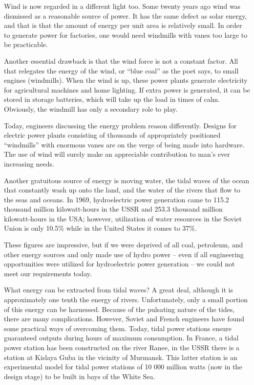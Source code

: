 Wind is now regarded in a different light too. Some twenty years ago wind was dismissed as a reasonable source of power. It has the same defect as solar energy, and that is that the amount of energy per unit area is relatively small. In order to generate power for factories, one would need windmills with vanes too large to be prac­ticable.

Another essential drawback is that the wind force is not a constant factor. All that relegates the energy of the wind, or ``blue coal'' as the poet says, to small engines (windmills). When the wind is up, these power plants generate electricity for agricultural machines and home lighting. If extra power is generated, it can be stored in storage batteries, which will take up the load in times of calm. Obviously, the windmill has only a sec­ondary role to play.

Today, engineers discussing the energy problem reason differently. Designs for electric power plants consisting of thousands of appropriately positioned ``windmills'' with enormous vanes are on the verge of being made into hardware. The use of wind will surely make an appre­ciable contribution to man's ever increasing needs.

Another gratuitous source of energy is moving water, the tidal waves of the ocean that constantly wash up onto the land, and the water of the rivers that flow to the seas and oceans. In 1969, hydroelectric power generation came to 115.2 thousand million kilowatt-hours in the USSR and 253.3 thousand million kilowatt-hours in the USA; however, utilization of water resources in the So­viet Union is only 10.5\% while in the United States it comes to 37\%.

These figures are impressive, but if we were deprived of all coal, petroleum, and other energy sources and only made use of hydro power -- even if all engineering opportunities were utilized for hydroelectric power generation -- we could not meet our requirements today.

What energy can be extracted from tidal waves? A great deal, although it is approximately one tenth the energy of rivers. Unfortunately, only a small portion of this energy can be harnessed. Because of the pulsating nature of the tides, there are many complications. However, Soviet and French engineers have found some practical ways of overcoming them. Today, tidal power stations ensure guaranteed outputs during hours of maximum consumption. In France, a tidal power station has been con­structed on the river Ranee, in the USSR there is a station at Kislaya Guba in the vicinity of Murmansk. This latter station is an experimental model for tidal power stations of 10 000 million watts (now in the design stage) to be built in bays of the White Sea.

